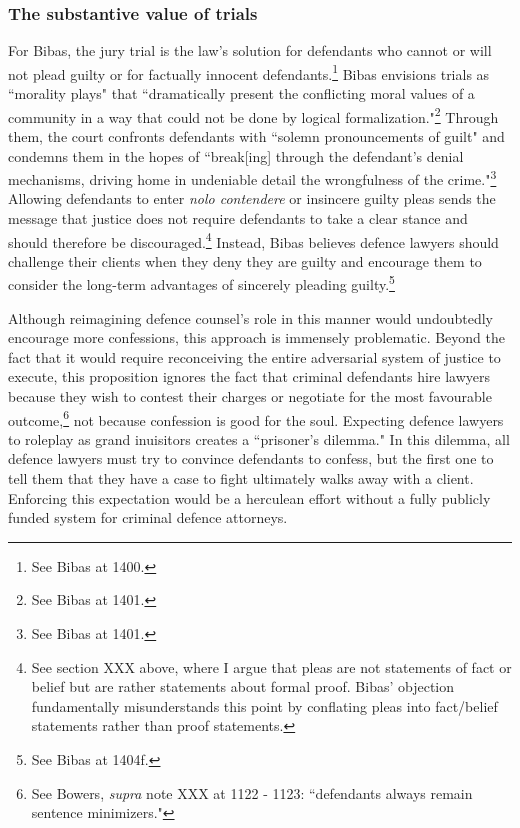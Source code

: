 \subsubsection{The substantive value of trials}

For Bibas, the jury trial is the law's solution for defendants who cannot or will not plead guilty or for factually innocent defendants.\footnote{See Bibas at 1400.} Bibas envisions trials as ``morality plays" that ``dramatically present the conflicting moral values of a community in a way that could not be done by logical formalization."\footnote{See Bibas at 1401.} Through them, the court confronts defendants with ``solemn pronouncements of guilt" and condemns them in the hopes of ``break[ing] through the defendant's denial mechanisms, driving home in undeniable detail the wrongfulness of the crime."\footnote{See Bibas at 1401.} Allowing defendants to enter \textit{nolo contendere} or insincere guilty pleas sends the message that justice does not require defendants to take a clear stance and should therefore be discouraged.\footnote{See section XXX above, where I argue that pleas are not statements of fact or belief but are rather statements about formal proof. Bibas' objection fundamentally misunderstands this point by conflating pleas into fact/belief statements rather than proof statements.} Instead, Bibas believes defence lawyers should challenge their clients when they deny they are guilty and encourage them to consider the long-term advantages of sincerely pleading guilty.\footnote{See Bibas at 1404f.}

Although reimagining defence counsel's role in this manner would undoubtedly encourage more confessions, this approach is immensely problematic. Beyond the fact that it would require reconceiving the entire adversarial system of justice to execute, this proposition ignores the fact that criminal defendants hire lawyers because they wish to contest their charges or negotiate for the most favourable outcome,\footnote{See Bowers, \textit{supra} note XXX at 1122 - 1123: ``defendants always remain sentence minimizers."} not because confession is good for the soul. Expecting defence lawyers to roleplay as grand inuisitors creates a ``prisoner's dilemma." In this dilemma, all defence lawyers must try to convince defendants to confess, but the first one to tell them that they have a case to fight ultimately walks away with a client. Enforcing this expectation would be a herculean effort without a fully publicly funded system for criminal defence attorneys.

